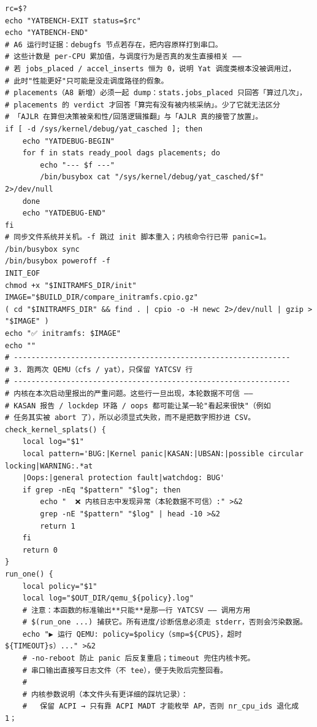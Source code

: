 \documentclass[10pt,a4paper]{article}
\newenvironment{yatpage}{\vspace*{0pt}}{\par}
\begin{document}
\begin{yatpage}
\begin{Verbatim}[fontsize=\fontsize{8.2}{9.8}\selectfont]
rc=$?
echo "YATBENCH-EXIT status=$rc"
echo "YATBENCH-END"
# A6 运行时证据：debugfs 节点若存在，把内容原样打到串口。
# 这些计数是 per-CPU 累加值，与调度行为是否真的发生直接相关 ——
# 若 jobs_placed / accel_inserts 恒为 0，说明 Yat 调度类根本没被调用过，
# 此时"性能更好"只可能是没走调度路径的假象。
# placements（A8 新增）必须一起 dump：stats.jobs_placed 只回答「算过几次」，
# placements 的 verdict 才回答「算完有没有被内核采纳」。少了它就无法区分
# 「AJLR 在算但决策被亲和性/回落逻辑推翻」与「AJLR 真的接管了放置」。
if [ -d /sys/kernel/debug/yat_casched ]; then
    echo "YATDEBUG-BEGIN"
    for f in stats ready_pool dags placements; do
        echo "--- $f ---"
        /bin/busybox cat "/sys/kernel/debug/yat_casched/$f" 2>/dev/null
    done
    echo "YATDEBUG-END"
fi
# 同步文件系统并关机。-f 跳过 init 脚本重入；内核命令行已带 panic=1。
/bin/busybox sync
/bin/busybox poweroff -f
INIT_EOF
chmod +x "$INITRAMFS_DIR/init"
IMAGE="$BUILD_DIR/compare_initramfs.cpio.gz"
( cd "$INITRAMFS_DIR" && find . | cpio -o -H newc 2>/dev/null | gzip > "$IMAGE" )
echo "✅ initramfs: $IMAGE"
echo ""
# ---------------------------------------------------------------
# 3. 跑两次 QEMU（cfs / yat），只保留 YATCSV 行
# ---------------------------------------------------------------
# 内核在本次启动里报出的严重问题。这些行一旦出现，本轮数据不可信 ——
# KASAN 报告 / lockdep 环路 / oops 都可能让某一轮"看起来很快"（例如
# 任务其实被 abort 了），所以必须显式失败，而不是把数字照抄进 CSV。
check_kernel_splats() {
    local log="$1"
    local pattern='BUG:|Kernel panic|KASAN:|UBSAN:|possible circular locking|WARNING:.*at 
    |Oops:|general protection fault|watchdog: BUG'
    if grep -nEq "$pattern" "$log"; then
        echo "  ❌ 内核日志中发现异常（本轮数据不可信）:" >&2
        grep -nE "$pattern" "$log" | head -10 >&2
        return 1
    fi
    return 0
}
run_one() {
    local policy="$1"
    local log="$OUT_DIR/qemu_${policy}.log"
    # 注意：本函数的标准输出**只能**是那一行 YATCSV —— 调用方用
    # $(run_one ...) 捕获它。所有进度/诊断信息必须走 stderr，否则会污染数据。
    echo "▶ 运行 QEMU: policy=$policy（smp=${CPUS}，超时 ${TIMEOUT}s）..." >&2
    # -no-reboot 防止 panic 后反复重启；timeout 兜住内核卡死。
    # 串口输出直接写日志文件（不 tee），便于失败后完整回看。
    #
    # 内核参数说明（本文件头有更详细的踩坑记录）：
    #   保留 ACPI → 只有靠 ACPI MADT 才能枚举 AP，否则 nr_cpu_ids 退化成 1；
\end{Verbatim}
\end{yatpage}
\end{document}
